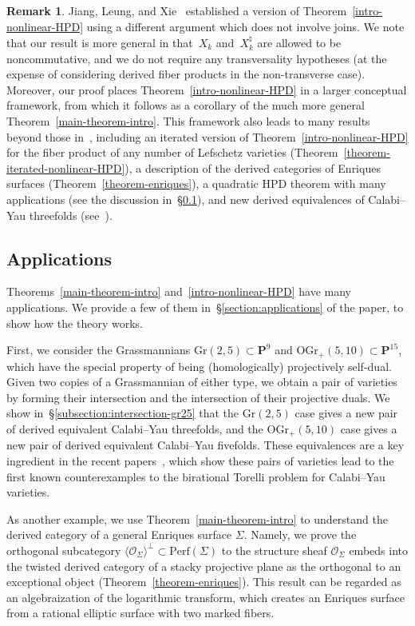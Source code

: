 \documentclass[11pt, reqno]{amsart}
\numberwithin{equation}{section}
\theoremstyle{plain}
\theoremstyle{definition}
\newtheorem{remark}[theorem]{Remark}
\newcommand{\Perf}{\mathrm{Perf}}
\newcommand{\hpd}{{\natural}}
\newcommand{\Gr}{\mathrm{Gr}}
\newcommand{\OGrp}{\mathrm{OGr_+}}
\newcommand{\cO}{\mathcal{O}}
\newcommand{\bP}{\mathbf{P}}
\begin{document}
\begin{remark}
Jiang, Leung, and Xie~\cite{categorical-plucker} established a version of 
Theorem~\ref{intro-nonlinear-HPD} using a different argument which does not involve joins. 
We note that our result is more general in that~$X_k$ and~$X_k^{\hpd}$ are allowed to be 
noncommutative, and we do not require any transversality hypotheses 
(at the expense of considering derived fiber products in the non-transverse case). 
Moreover, our proof places Theorem~\ref{intro-nonlinear-HPD} in a larger conceptual framework, 
from which it follows as a corollary of the much more general  
Theorem~\ref{main-theorem-intro}. 
This framework also leads to many results 
beyond those in~\cite{categorical-plucker},
including an iterated version of Theorem~\ref{intro-nonlinear-HPD} 
for the fiber product of any number of Lefschetz varieties (Theorem~\ref{theorem-iterated-nonlinear-HPD}), 
a description of the derived categories of Enriques surfaces (Theorem~\ref{theorem-enriques}), 
a quadratic HPD theorem with many applications (see the discussion in~\S\ref{intro-applications}), 
and new derived equivalences of Calabi--Yau threefolds (see~\cite{inoue}). 
\end{remark}


\subsection{Applications} 
\label{intro-applications} 
Theorems~\ref{main-theorem-intro} and~\ref{intro-nonlinear-HPD} have many applications. 
We provide a few of them in~\S\ref{section:applications} of the paper, to show how the theory works.

First, we consider the Grassmannians $\Gr(2,5) \subset \bP^9$ and $\OGrp(5,10) \subset \bP^{15}$, 
which have the special property of being (homologically) projectively self-dual. 
Given two copies of a Grassmannian of either type, we obtain a pair of 
varieties by forming their intersection and the intersection of their projective duals.  
We show in~\S\ref{subsection:intersection-gr25} that the $\Gr(2,5)$ case  
gives a new pair of derived equivalent Calabi--Yau threefolds, 
and the $\OGrp(5,10)$ case gives a new pair of derived equivalent Calabi--Yau fivefolds. 
These equivalences are a key ingredient in the recent papers~\cite{GPK3,jj-torelli,double-spinor}, 
which show these pairs of varieties lead to the first known counterexamples to 
the birational Torelli problem for Calabi--Yau varieties. 

As another example, we use Theorem~\ref{main-theorem-intro} to understand the derived 
category of a general Enriques surface $\Sigma$. 
Namely, we prove 
the orthogonal subcategory 
$\langle \cO_{\Sigma} \rangle^{\perp} \subset \Perf(\Sigma)$ 
to the structure sheaf $\cO_\Sigma$ 
embeds into the twisted derived category of a stacky projective plane as the orthogonal to an 
exceptional object (Theorem~\ref{theorem-enriques}). 
This result can be regarded as an algebraization of the logarithmic transform, which creates 
an Enriques surface from a rational elliptic surface with two marked fibers. 
\end{document}
